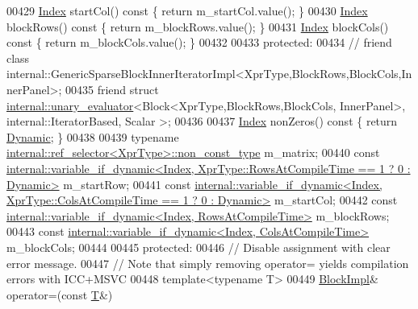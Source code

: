 \begin{DoxyCode}
00429     \hyperlink{group___core___module_a554f30542cc2316add4b1ea0a492ff02}{Index} startCol()\textcolor{keyword}{ const }\{ \textcolor{keywordflow}{return} m\_startCol.value(); \}
00430     \hyperlink{group___core___module_a554f30542cc2316add4b1ea0a492ff02}{Index} blockRows()\textcolor{keyword}{ const }\{ \textcolor{keywordflow}{return} m\_blockRows.value(); \}
00431     \hyperlink{group___core___module_a554f30542cc2316add4b1ea0a492ff02}{Index} blockCols()\textcolor{keyword}{ const }\{ \textcolor{keywordflow}{return} m\_blockCols.value(); \}
00432 
00433   \textcolor{keyword}{protected}:
00434 \textcolor{comment}{//     friend class internal::GenericSparseBlockInnerIteratorImpl<XprType,BlockRows,BlockCols,InnerPanel>;}
00435     \textcolor{keyword}{friend} \textcolor{keyword}{struct }\hyperlink{struct_eigen_1_1internal_1_1unary__evaluator}{internal::unary\_evaluator}<Block<XprType,BlockRows,BlockCols,
      InnerPanel>, internal::IteratorBased, Scalar >;
00436 
00437     \hyperlink{group___core___module_a554f30542cc2316add4b1ea0a492ff02}{Index} nonZeros() const \{ \textcolor{keywordflow}{return} \hyperlink{namespace_eigen_ad81fa7195215a0ce30017dfac309f0b2}{Dynamic}; \}
00438 
00439     \textcolor{keyword}{typename} \hyperlink{class_eigen_1_1internal_1_1_tensor_lazy_evaluator_writable}{internal::ref\_selector<XprType>::non\_const\_type}
       m\_matrix;
00440     \textcolor{keyword}{const} 
      \hyperlink{class_eigen_1_1internal_1_1variable__if__dynamic}{internal::variable\_if\_dynamic<Index, XprType::RowsAtCompileTime == 1 ? 0 : Dynamic>}
       m\_startRow;
00441     \textcolor{keyword}{const} 
      \hyperlink{class_eigen_1_1internal_1_1variable__if__dynamic}{internal::variable\_if\_dynamic<Index, XprType::ColsAtCompileTime == 1 ? 0 : Dynamic>}
       m\_startCol;
00442     \textcolor{keyword}{const} \hyperlink{class_eigen_1_1internal_1_1variable__if__dynamic}{internal::variable\_if\_dynamic<Index, RowsAtCompileTime>}
       m\_blockRows;
00443     \textcolor{keyword}{const} \hyperlink{class_eigen_1_1internal_1_1variable__if__dynamic}{internal::variable\_if\_dynamic<Index, ColsAtCompileTime>}
       m\_blockCols;
00444 
00445   \textcolor{keyword}{protected}:
00446     \textcolor{comment}{// Disable assignment with clear error message.}
00447     \textcolor{comment}{// Note that simply removing operator= yields compilation errors with ICC+MSVC}
00448     \textcolor{keyword}{template}<\textcolor{keyword}{typename} T>
00449     \hyperlink{class_eigen_1_1_block_impl}{BlockImpl}& operator=(\textcolor{keyword}{const} \hyperlink{group___sparse_core___module}{T}&)

\end{DoxyCode}
